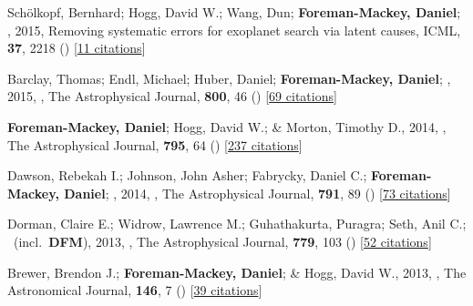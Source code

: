 \item[{\color{numcolor}\scriptsize8}] Sch{\"o}lkopf, Bernhard; Hogg, David W.; Wang, Dun; \textbf{Foreman-Mackey, Daniel}; \etal, 2015, Removing systematic errors for exoplanet search via latent causes, ICML, \textbf{37}, 2218 () [\href{https://scholar.google.com/scholar?cites=11768165421845046384}{11 citations}]

\item[{\color{numcolor}\scriptsize7}] Barclay, Thomas; Endl, Michael; Huber, Daniel; \textbf{Foreman-Mackey, Daniel}; \etal, 2015, , The Astrophysical Journal, \textbf{800}, 46 () [\href{https://ui.adsabs.harvard.edu/abs/2015ApJ...800...46B}{69 citations}]

\item[{\color{numcolor}\scriptsize6}] \textbf{Foreman-Mackey, Daniel}; Hogg, David W.; \& Morton, Timothy D., 2014, , The Astrophysical Journal, \textbf{795}, 64 () [\href{https://ui.adsabs.harvard.edu/abs/2014ApJ...795...64F}{237 citations}]

\item[{\color{numcolor}\scriptsize5}] Dawson, Rebekah I.; Johnson, John Asher; Fabrycky, Daniel C.; \textbf{Foreman-Mackey, Daniel}; \etal, 2014, , The Astrophysical Journal, \textbf{791}, 89 () [\href{https://ui.adsabs.harvard.edu/abs/2014ApJ...791...89D}{73 citations}]

\item[{\color{numcolor}\scriptsize4}] Dorman, Claire E.; Widrow, Lawrence M.; Guhathakurta, Puragra; Seth, Anil C.; \etal\ (incl.\ \textbf{DFM}), 2013, , The Astrophysical Journal, \textbf{779}, 103 () [\href{https://ui.adsabs.harvard.edu/abs/2013ApJ...779..103D}{52 citations}]

\item[{\color{numcolor}\scriptsize3}] Brewer, Brendon J.; \textbf{Foreman-Mackey, Daniel}; \& Hogg, David W., 2013, , The Astronomical Journal, \textbf{146}, 7 () [\href{https://ui.adsabs.harvard.edu/abs/2013AJ....146....7B}{39 citations}]

